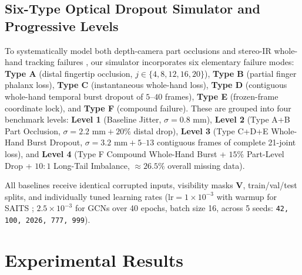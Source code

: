 \documentclass[10pt,twocolumn]{article}
\begin{document}
\subsection{Six-Type Optical Dropout Simulator and Progressive Levels}
To systematically model both depth-camera part occlusions \cite{de2017shrec} and stereo-IR whole-hand tracking failures \cite{boulahia2017dynamic, matuszczyk2025lmc2}, our simulator incorporates six elementary failure modes: \textbf{Type A} (distal fingertip occlusion, $j \in \{4,8,12,16,20\}$), \textbf{Type B} (partial finger phalanx loss), \textbf{Type C} (instantaneous whole-hand loss), \textbf{Type D} (contiguous whole-hand temporal burst dropout of $5\text{--}40$ frames), \textbf{Type E} (frozen-frame coordinate lock), and \textbf{Type F} (compound failure). These are grouped into four benchmark levels: \textbf{Level 1} (Baseline Jitter, $\sigma=0.8\text{ mm}$), \textbf{Level 2} (Type A+B Part Occlusion, $\sigma=2.2\text{ mm} + 20\%$ distal drop), \textbf{Level 3} (Type C+D+E Whole-Hand Burst Dropout, $\sigma=3.2\text{ mm} + 5\text{--}13$ contiguous frames of complete 21-joint loss), and \textbf{Level 4} (Type F Compound Whole-Hand Burst + $15\%$ Part-Level Drop + $10:1$ Long-Tail Imbalance, $\approx 26.5\%$ overall missing data).

All baselines receive identical corrupted inputs, visibility masks $\mathbf{V}$, train/val/test splits, and individually tuned learning rates ($\text{lr}=1\times 10^{-3}$ with warmup for SAITS \cite{du2023saits}; $2.5\times 10^{-3}$ for GCNs over 40 epochs, batch size 16, across 5 seeds: \texttt{42, 100, 2026, 777, 999}).

\section{Experimental Results}
\end{document}
